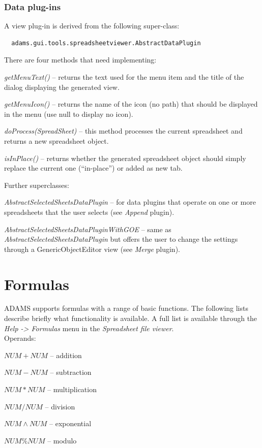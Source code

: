 \documentclass[a4paper]{book}
\begin{document}
\subsection{Data plug-ins}
A view plug-in is derived from the following super-class:
\begin{verbatim}
  adams.gui.tools.spreadsheetviewer.AbstractDataPlugin
\end{verbatim}
There are four methods that need implementing:
\begin{tight_itemize}
	\item \textit{getMenuText()} -- returns the text used for the menu item 
	and the title of the dialog displaying the generated view.
	\item \textit{getMenuIcon()} -- returns the name of the icon (no path)
	that should be displayed in the menu (use null to display no icon). 
	\item \textit{doProcess(SpreadSheet)} -- this method processes the
	current spreadsheet and returns a new spreadsheet object.
	\item \textit{isInPlace()} -- returns whether the generated spreadsheet
	object should simply replace the current one (``in-place'') or added as
	new tab.
\end{tight_itemize}
Further superclasses:
\begin{tight_itemize}
	\item \textit{AbstractSelectedSheetsDataPlugin} -- for data plugins that
	operate on one or more spreadsheets that the user selects (see 
	\textit{Append} plugin).
	\item \textit{AbstractSelectedSheetsDataPluginWithGOE} -- same as
	\textit{AbstractSelectedSheetsDataPlugin} but offers the user to change
	the settings through a GenericObjectEditor view (see \textit{Merge} plugin).
\end{tight_itemize}

\clearpage
\chapter{Formulas}
ADAMS supports formulas with a range of basic functions. The following lists
describe briefly what functionality is available. A full list is available 
through the \textit{Help -> Formulas} menu in the \textit{Spreadsheet file viewer}. \\

\noindent Operands:
\begin{tight_itemize}
	\item \textit{$NUM + NUM$} -- addition
	\item \textit{$NUM - NUM$} -- subtraction
	\item \textit{$NUM * NUM$} -- multiplication
	\item \textit{$NUM / NUM$} -- division
	\item \textit{$NUM \wedge NUM$} -- exponential
	\item \textit{$NUM \% NUM$} -- modulo
\end{tight_itemize}
\end{document}

